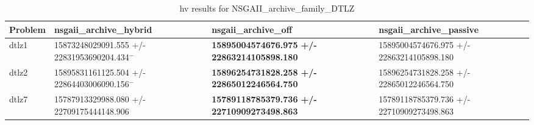 \begin{table}
\caption{hv results for NSGAII_archive_family_DTLZ}
\label{NSGAII_archive_family_DTLZ_hv}
\begin{tabular}{llll}
\toprule
Problem & nsgaii_archive_hybrid & nsgaii_archive_off & nsgaii_archive_passive \\
\midrule
dtlz1 & 15873248029091.555 +/- 22831953690204.434$^{-}$ & \textbf{15895004574676.975 +/- 22863214105898.180} & 15895004574676.975 +/- 22863214105898.180 \\
dtlz2 & 15895831161125.504 +/- 22864403006090.156$^{-}$ & \textbf{15896254731828.258 +/- 22865012246564.750} & 15896254731828.258 +/- 22865012246564.750 \\
dtlz7 & 15787913329988.080 +/- 22709175444148.906 & \textbf{15789118785379.736 +/- 22710909273498.863} & 15789118785379.736 +/- 22710909273498.863 \\
\bottomrule
\end{tabular}
\end{table}
